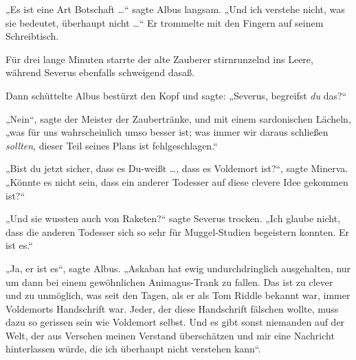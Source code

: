 „Es ist eine Art Botschaft …“ sagte Albus langsam.
„Und ich verstehe nicht, was sie bedeutet, überhaupt nicht …“ Er trommelte mit den Fingern auf seinem Schreibtisch.

Für drei lange Minuten starrte der alte Zauberer stirnrunzelnd ins Leere, während Severus ebenfalls schweigend dasaß.

Dann schüttelte Albus bestürzt den Kopf und sagte:
„Severus, begreifst \emph{du} das?“

„Nein“, sagte der Meister der Zaubertränke, und mit einem sardonischen Lächeln, „was für uns wahrscheinlich umso besser ist; was immer wir daraus schließen \emph{sollten}, dieser Teil seines Plans ist fehlgeschlagen.“

„Bist du jetzt sicher, dass es Du-weißt …, dass es Voldemort ist?“, sagte Minerva.
„Könnte es nicht sein, dass ein anderer Todesser auf diese clevere Idee gekommen ist?“

„Und sie wussten auch von Raketen?“ sagte Severus trocken.
„Ich glaube nicht, dass die anderen Todesser sich so sehr für Muggel-Studien begeistern konnten. Er ist es.“

„Ja, er ist es“, sagte Albus.
„Askaban hat ewig undurchdringlich ausgehalten, nur um dann bei einem gewöhnlichen Animagus-Trank zu fallen. Das ist zu clever und zu unmöglich, was seit den Tagen, als er als Tom Riddle bekannt war, immer Voldemorts Handschrift war. Jeder, der diese Handschrift fälschen wollte, muss dazu so gerissen sein wie Voldemort selbst. Und es gibt sonst niemanden auf der Welt, der aus Versehen meinen Verstand überschätzen und mir eine Nachricht hinterlassen würde, die ich überhaupt nicht verstehen kann“.

